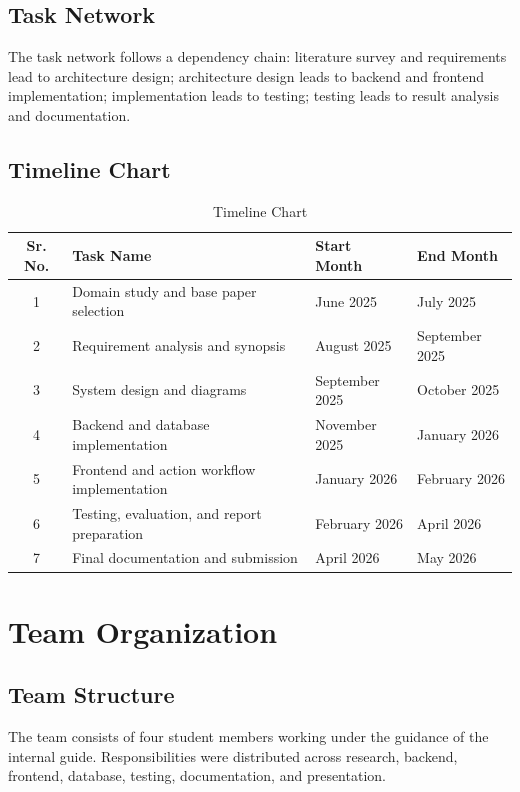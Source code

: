 \subsection{Task Network}
The task network follows a dependency chain: literature survey and requirements lead to architecture design; architecture design leads to backend and frontend implementation; implementation leads to testing; testing leads to result analysis and documentation.

\subsection{Timeline Chart}
\begin{table}[H]
\centering
\caption{Timeline Chart}
\def\arraystretch{1.3}
\begin{tabularx}{\textwidth}{|c|X|l|l|}
\hline
\textbf{Sr. No.} & \textbf{Task Name} & \textbf{Start Month} & \textbf{End Month} \\ \hline
1 & Domain study and base paper selection & June 2025 & July 2025 \\ \hline
2 & Requirement analysis and synopsis & August 2025 & September 2025 \\ \hline
3 & System design and diagrams & September 2025 & October 2025 \\ \hline
4 & Backend and database implementation & November 2025 & January 2026 \\ \hline
5 & Frontend and action workflow implementation & January 2026 & February 2026 \\ \hline
6 & Testing, evaluation, and report preparation & February 2026 & April 2026 \\ \hline
7 & Final documentation and submission & April 2026 & May 2026 \\ \hline
\end{tabularx}
\end{table}

\section{Team Organization}
\subsection{Team Structure}
The team consists of four student members working under the guidance of the internal guide. Responsibilities were distributed across research, backend, frontend, database, testing, documentation, and presentation.

